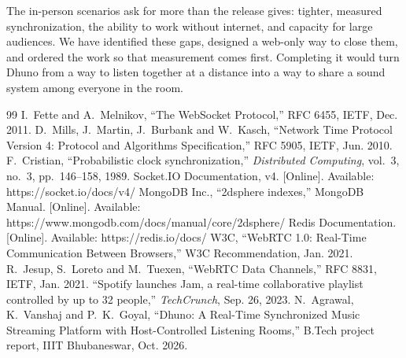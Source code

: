 \documentclass[11pt,a4paper]{article}
\begin{document}
The in-person scenarios ask for more than the release gives: tighter, measured
synchronization, the ability to work without internet, and capacity for large audiences.
We have identified these gaps, designed a web-only way to close them, and ordered the work
so that measurement comes first. Completing it would turn Dhuno from a way to listen
together at a distance into a way to share a sound system among everyone in the room.

\begin{thebibliography}{99}
 I.~Fette and A.~Melnikov, ``The WebSocket Protocol,'' RFC 6455, IETF, Dec. 2011.
 D.~Mills, J.~Martin, J.~Burbank and W.~Kasch, ``Network Time Protocol Version 4: Protocol and Algorithms Specification,'' RFC 5905, IETF, Jun. 2010.
 F.~Cristian, ``Probabilistic clock synchronization,'' \emph{Distributed Computing}, vol.~3, no.~3, pp.~146--158, 1989.
 Socket.IO Documentation, v4. [Online]. Available: https://socket.io/docs/v4/
 MongoDB Inc., ``2dsphere indexes,'' MongoDB Manual. [Online]. Available: https://www.mongodb.com/docs/manual/core/2dsphere/
 Redis Documentation. [Online]. Available: https://redis.io/docs/
 W3C, ``WebRTC 1.0: Real-Time Communication Between Browsers,'' W3C Recommendation, Jan. 2021.
 R.~Jesup, S.~Loreto and M.~Tuexen, ``WebRTC Data Channels,'' RFC 8831, IETF, Jan. 2021.
 ``Spotify launches Jam, a real-time collaborative playlist controlled by up to 32 people,'' \emph{TechCrunch}, Sep. 26, 2023.
 N.~Agrawal, K.~Vanshaj and P.~K.~Goyal, ``Dhuno: A Real-Time Synchronized Music Streaming Platform with Host-Controlled Listening Rooms,'' B.Tech project report, IIIT Bhubaneswar, Oct. 2026.
\end{thebibliography}
\end{document}
